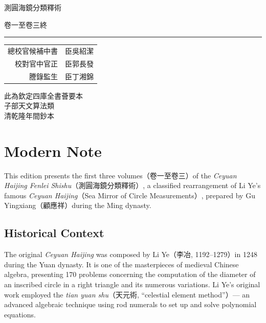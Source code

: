 \documentclass[11pt,a4paper]{article}
\newcommand{\shortline}{\noindent\rule{0.5\textwidth}{0.4pt}\par}
\newcounter{problem}[section]
\begin{document}
\thispagestyle{empty}
\begin{center}
\vspace*{3cm}
{\Large 測圓海鏡分類釋術}

\vspace{1cm}
{\large 卷一至卷三終}

\vspace{2cm}
\shortline

\vspace{1cm}
{\normalsize
\begin{tabular}{rl}
總校官候補中書 & 臣吳紹潔 \\
校對官中官正 & 臣郭長發 \\
謄錄監生 & 臣丁湘錦 \\
\end{tabular}
}

\vspace{2cm}
{\small\textcolor{notecolor}{%
此為欽定四庫全書薈要本\\
子部天文算法類\\
清乾隆年間鈔本
}}

\end{center}

\clearpage

\section*{Modern Note}

This edition presents the first three volumes（卷一至卷三）of the \textit{Ceyuan Haijing Fenlei Shishu}（測圓海鏡分類釋術）, a classified rearrangement of Li Ye's famous \textit{Ceyuan Haijing}（Sea Mirror of Circle Measurements）, prepared by Gu Yingxiang（顧應祥）during the Ming dynasty.

\subsection*{Historical Context}
The original \textit{Ceyuan Haijing} was composed by Li Ye（李冶, 1192--1279）in 1248 during the Yuan dynasty. It is one of the masterpieces of medieval Chinese algebra, presenting 170 problems concerning the computation of the diameter of an inscribed circle in a right triangle and its numerous variations. Li Ye's original work employed the \textit{tian yuan shu}（天元術, ``celestial element method''）--- an advanced algebraic technique using rod numerals to set up and solve polynomial equations.
\end{document}
